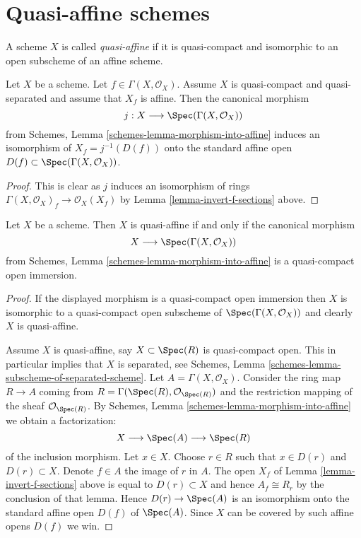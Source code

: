 \section{Quasi-affine schemes}
\label{section-quasi-affine}

\begin{definition}
\label{definition-quasi-affine}
A scheme $X$ is called {\it quasi-affine} if it is quasi-compact
and isomorphic to an open subscheme of an affine scheme.
\end{definition}


\begin{lemma}
\label{lemma-invert-f-affine}
Let $X$ be a scheme. Let $f \in \Gamma(X, \mathcal{O}_X)$.
Assume $X$ is quasi-compact and quasi-separated and assume that
$X_f$ is affine. Then the canonical morphism
$$
j : X \longrightarrow \Spec(\Gamma(X, \mathcal{O}_X))
$$
from Schemes, Lemma \ref{schemes-lemma-morphism-into-affine}
induces an isomorphism of $X_f = j^{-1}(D(f))$ onto the standard affine
open $D(f) \subset \Spec(\Gamma(X, \mathcal{O}_X))$.
\end{lemma}

\begin{proof}
This is clear as $j$ induces an isomorphism of rings
$\Gamma(X, \mathcal{O}_X)_f \to \mathcal{O}_X(X_f)$ by
Lemma \ref{lemma-invert-f-sections} above.
\end{proof}

\begin{lemma}
\label{lemma-quasi-affine}
Let $X$ be a scheme. Then $X$ is quasi-affine if and only if
the canonical morphism
$$
X \longrightarrow \Spec(\Gamma(X, \mathcal{O}_X))
$$
from Schemes, Lemma \ref{schemes-lemma-morphism-into-affine} is
a quasi-compact open immersion.
\end{lemma}

\begin{proof}
If the displayed morphism is a quasi-compact open immersion then
$X$ is isomorphic to a quasi-compact open subscheme of
$\Spec(\Gamma(X, \mathcal{O}_X))$ and clearly $X$ is quasi-affine.

\medskip\noindent
Assume $X$ is quasi-affine, say $X \subset \Spec(R)$ is
quasi-compact open. This in particular implies that $X$ is
separated, see
Schemes, Lemma \ref{schemes-lemma-subscheme-of-separated-scheme}.
Let $A = \Gamma(X, \mathcal{O}_X)$.
Consider the ring map $R \to A$ coming from
$R = \Gamma(\Spec(R), \mathcal{O}_{\Spec(R)})$
and the restriction mapping of the sheaf $\mathcal{O}_{\Spec(R)}$.
By Schemes, Lemma \ref{schemes-lemma-morphism-into-affine}
we obtain a factorization:
$$
X \longrightarrow
\Spec(A) \longrightarrow
\Spec(R)
$$
of the inclusion morphism. Let $x \in X$. Choose $r \in R$ such that
$x \in D(r)$ and $D(r) \subset X$. Denote $f \in A$ the image of $r$
in $A$. The open $X_f$ of Lemma \ref{lemma-invert-f-sections}
above is equal to $D(r) \subset X$ and hence $A_f \cong R_r$ by the
conclusion of that lemma.
Hence $D(r) \to \Spec(A)$ is an isomorphism onto the
standard affine open $D(f)$ of $\Spec(A)$. Since $X$
can be covered by such affine opens $D(f)$ we win.
\end{proof}

